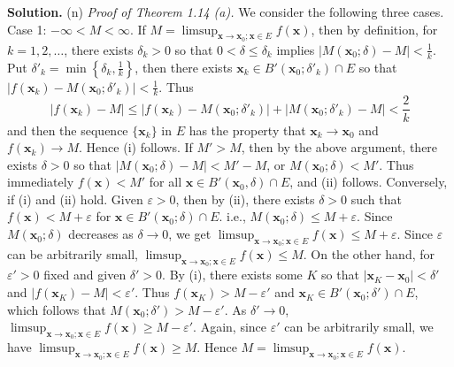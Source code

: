 \documentclass[12pt]{article}
\theoremstyle{definition}
\begin{document}
\smallskip
\noindent\textbf{Solution.}\quad
(n) \textit{Proof of Theorem 1.14 (a).} We consider the following three cases.
Case 1: $-\infty<M<\infty$. If $M=\limsup_{\mathbf{x}\to\mathbf{x}_0; \mathbf{x}\in E}f(\mathbf{x})$, then by definition, for $k=1,2,\ldots$, there exists $\delta_k>0$ so that $0<\delta\le\delta_k$ implies $\left\vert M(\mathbf{x}_0;\delta)-M\right\vert<\frac{1}{k}$. Put $\delta'_k=\min\left\{\delta_k,\frac{1}{k}\right\}$, then there exists $\mathbf{x}_k\in B'(\mathbf{x}_0;\delta'_k)\cap E$ so that $\left\vert f(\mathbf{x}_k)-M(\mathbf{x}_0;\delta'_k)\right\vert<\frac{1}{k}$. Thus
$$
\left\vert  f(\mathbf{x}_k)-M\right\vert
\le \left\vert f(\mathbf{x}_k)-M(\mathbf{x}_0;\delta'_k)\right\vert+\left\vert M(\mathbf{x}_0;\delta'_k)-M\right\vert
<\frac{2}{k}
$$
and then the sequence $\{\mathbf{x}_k\}$ in $E$ has the property that $\mathbf{x}_k\to\mathbf{x}_0$ and $f(\mathbf{x}_k)\to M$. Hence (i) follows. If $M'>M$, then by the above argument, there exists $\delta>0$ so that $\left\vert M(\mathbf{x}_0;\delta)-M\right\vert<M'-M$, or $M(\mathbf{x}_0;\delta)<M'$. Thus immediately $f(\mathbf{x})<M'$ for all $\mathbf{x}\in B'(\mathbf{x}_0,\delta)\cap E$, and (ii) follows. Conversely, if (i) and (ii) hold. Given $\varepsilon>0$, then by (ii), there exists $\delta>0$ such that $f(\mathbf{x})<M+\varepsilon$ for $\mathbf{x}\in B'(\mathbf{x}_0;\delta)\cap E$. i.e., $M(\mathbf{x}_0;\delta)\le M+\varepsilon$. Since $M(\mathbf{x}_0;\delta)$ decreases as $\delta\to 0$, we get $\limsup_{\mathbf{x}\to\mathbf{x}_0; \mathbf{x}\in E}f(\mathbf{x})\le M+\varepsilon$. Since $\varepsilon$ can be arbitrarily small, $\limsup_{\mathbf{x}\to\mathbf{x}_0; \mathbf{x}\in E}f(\mathbf{x})\le M$. On the other hand, for $\varepsilon'>0$ fixed and given $\delta'>0$. By (i), there exists some $K$ so that $\left\vert \mathbf{x}_K-\mathbf{x}_0\right\vert<\delta'$ and $\left\vert f(\mathbf{x}_K)-M\right\vert<\varepsilon'$. Thus $f(\mathbf{x}_K)>M-\varepsilon'$ and $\mathbf{x}_K\in B'(\mathbf{x}_0;\delta')\cap E$, which follows that  $M(\mathbf{x}_0;\delta')>M-\varepsilon'$. As $\delta'\to 0$, $\limsup_{\mathbf{x}\to\mathbf{x}_0; \mathbf{x}\in E}f(\mathbf{x})\ge M-\varepsilon'$. Again, since $\varepsilon'$ can be arbitrarily small, we have $\limsup_{\mathbf{x}\to\mathbf{x}_0; \mathbf{x}\in E}f(\mathbf{x})\ge M$. Hence $M=\limsup_{\mathbf{x}\to\mathbf{x}_0; \mathbf{x}\in E}f(\mathbf{x})$.
\end{document}
